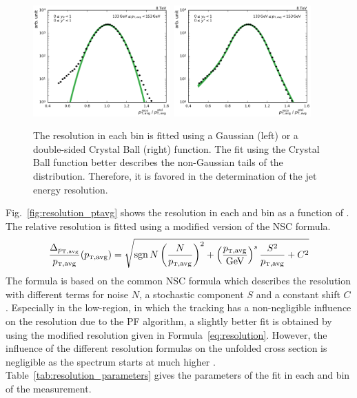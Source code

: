 \begin{figure}[h!tbp]
    \centering
    \includegraphics[width=0.47\textwidth]{figures/measurement/resolution_yb0ys0_bin10.pdf}\hfill
    \includegraphics[width=0.47\textwidth]{figures/measurement/resolution_yb0ys0_bin10_cb.pdf}
    \caption[Gaussian and Crystal Ball fit of resolution.]{The resolution in
        each \ptavg bin is fitted using a Gaussian (left) or a double-sided Crystal Ball
        (right) function. The fit using the Crystal Ball function better describes the
        non-Gaussian tails of the distribution. Therefore, it is favored in the
    determination of the jet energy resolution.}
    \label{fig:resolution_bin}
\end{figure}

Fig.~\ref{fig:resolution_ptavg} shows the resolution in each \ystar and
\yboost bin as a function of \ptavg. The relative resolution is fitted using a
modified version of the NSC formula.
%
\begin{equation}
    \frac{\Delta_{\ptavg}}{\ptavg} (\ptavg) = \sqrt{\sgn{N} \left(\frac{N}{\ptavg}\right)^2 + \left(\frac{\ptavg}{\text{GeV}}\right)^s \frac{S^2}{\ptavg} + C^2 }
    \label{eq:resolution}
\end{equation}
%
The formula is based on the common NSC formula which describes the resolution
with different terms for noise $N$, a stochastic component $S$ and a constant
shift $C$. Especially in the low-\pt region, in which the tracking has a
non-negligible influence on the resolution due to the PF algorithm, a
slightly better fit is obtained by using the modified resolution given in
Formula~\ref{eq:resolution}. However, the influence of the different resolution formulas
on the unfolded cross section is negligible as the spectrum starts at
much higher \ptavg. Table~\ref{tab:resolution_parameters} gives the parameters of
the fit in each \ystar and \yboost bin of the measurement.


